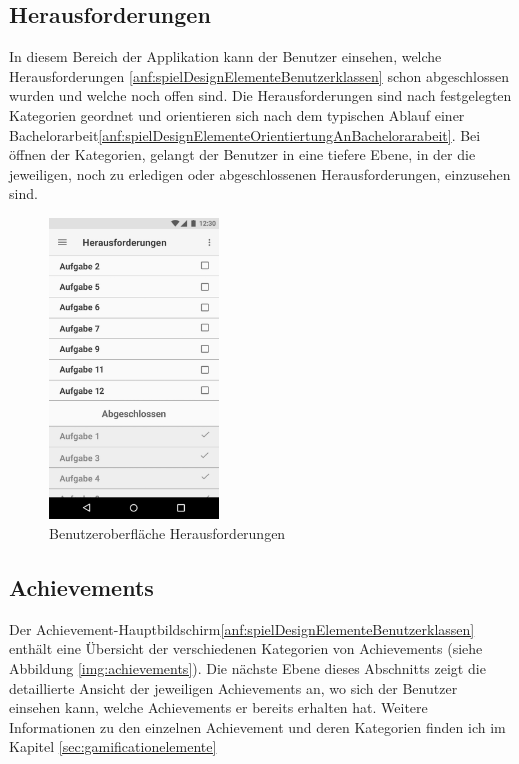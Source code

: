 \documentclass[bibliography=totoc,listof=totoc,BCOR=5mm,DIV=12,oneside]{scrbook}
\begin{document}
\newpage
\subsection{Herausforderungen}
\par In diesem Bereich der Applikation kann der Benutzer einsehen, welche Herausforderungen \ref{anf:spielDesignElementeBenutzerklassen} schon abgeschlossen wurden und welche noch offen sind. Die Herausforderungen sind nach festgelegten Kategorien geordnet und orientieren sich nach dem typischen Ablauf einer Bachelorarbeit\ref{anf:spielDesignElementeOrientiertungAnBachelorarabeit}. Bei öffnen der Kategorien, gelangt der Benutzer in eine tiefere Ebene, in der die jeweiligen, noch zu erledigen oder abgeschlossenen Herausforderungen, einzusehen sind.

\begin{figure}[H]
	\centering
	\includegraphics[width=0.4\textwidth, keepaspectratio]{Bilder/Prototyp/AufgabenSortiert.jpg}
	\caption{Benutzeroberfläche Herausforderungen}
	\label{img:aufgaben}
\end{figure}

\newpage
\subsection{Achievements}
\par Der Achievement-Hauptbildschirm\ref{anf:spielDesignElementeBenutzerklassen} enthält eine Übersicht der verschiedenen Kategorien von Achievements (siehe Abbildung \ref{img:achievements}). Die nächste Ebene dieses Abschnitts zeigt die detaillierte Ansicht der jeweiligen Achievements an, wo sich der Benutzer einsehen kann, welche Achievements er bereits erhalten hat. Weitere Informationen zu den einzelnen Achievement und deren Kategorien finden ich im Kapitel \ref{sec:gamificationelemente}\\
\end{document}
